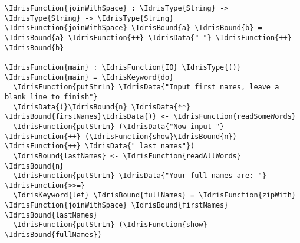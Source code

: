 \documentclass[xetex,xcolor={usenames,dvipsnames},mathserif,serif,17pt]{beamer}
\newcommand{\IdrisData}[1]{\textcolor{red}{#1}}
\newcommand{\IdrisType}[1]{\textcolor{blue}{#1}}
\newcommand{\IdrisBound}[1]{\textcolor{violet}{#1}}
\newcommand{\IdrisFunction}[1]{\textcolor{OliveGreen}{#1}}
\newcommand{\IdrisKeyword}[1]{{\underline{#1}}}
\begin{document}
\begin{frame}[fragile]
\begin{Verbatim}[commandchars=\\\{\}]
\IdrisFunction{joinWithSpace} : \IdrisType{String} -> \IdrisType{String} -> \IdrisType{String}
\IdrisFunction{joinWithSpace} \IdrisBound{a} \IdrisBound{b} = \IdrisBound{a} \IdrisFunction{++} \IdrisData{" "} \IdrisFunction{++} \IdrisBound{b}

\IdrisFunction{main} : \IdrisFunction{IO} \IdrisType{()}
\IdrisFunction{main} = \IdrisKeyword{do}
  \IdrisFunction{putStrLn} \IdrisData{"Input first names, leave a blank line to finish"}
  \IdrisData{(}\IdrisBound{n} \IdrisData{**} \IdrisBound{firstNames}\IdrisData{)} <- \IdrisFunction{readSomeWords}
  \IdrisFunction{putStrLn} (\IdrisData{"Now input "} \IdrisFunction{++} (\IdrisFunction{show}\IdrisBound{n}) \IdrisFunction{++} \IdrisData{" last names"})
  \IdrisBound{lastNames} <- \IdrisFunction{readAllWords} \IdrisBound{n}
  \IdrisFunction{putStrLn} \IdrisData{"Your full names are: "} \IdrisFunction{>>=}
  \IdrisKeyword{let} \IdrisBound{fullNames} = \IdrisFunction{zipWith} \IdrisFunction{joinWithSpace} \IdrisBound{firstNames} \IdrisBound{lastNames}
  \IdrisFunction{putStrLn} (\IdrisFunction{show} \IdrisBound{fullNames})
\end{Verbatim}
\end{frame}
\end{document}
